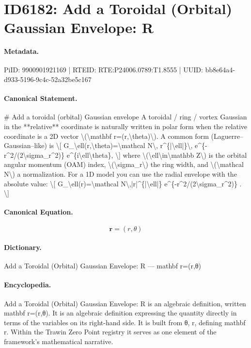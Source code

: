 \section*{ID6182: Add a Toroidal (Orbital) Gaussian Envelope: R}
\paragraph{Metadata.}
PiID: 9900901921169 | RTEID: RTE:P24006.0789:T1.8555 | UUID: bb8e64a4-d933-5196-9c4c-52a32be5c167

\paragraph{Canonical Statement.}
\# Add a toroidal (orbital) Gaussian envelope A toroidal / ring / vortex Gaussian in the **relative** coordinate is naturally written in polar form when the relative coordinate is a 2D vector \textbackslash{}(\textbackslash{}mathbf r=(r,\textbackslash{}theta)\textbackslash{}). A common form (Laguerre–Gaussian–like) is \textbackslash{}[ G\_\textbackslash{}ell(r,\textbackslash{}theta)=\textbackslash{}mathcal N\textbackslash{}, r\textasciicircum{}\{|\textbackslash{}ell|\}\textbackslash{}, e\textasciicircum{}\{-r\textasciicircum{}2/(2\textbackslash{}sigma\_r\textasciicircum{}2)\} e\textasciicircum{}\{i\textbackslash{}ell\textbackslash{}theta\}, \textbackslash{}] where \textbackslash{}(\textbackslash{}ell\textbackslash{}in\textbackslash{}mathbb Z\textbackslash{}) is the orbital angular momentum (OAM) index, \textbackslash{}(\textbackslash{}sigma\_r\textbackslash{}) the ring width, and \textbackslash{}(\textbackslash{}mathcal N\textbackslash{}) a normalization. For a 1D model you can use the radial envelope with the absolute value: \textbackslash{}[ G\_\textbackslash{}ell(r)=\textbackslash{}mathcal N\textbackslash{},|r|\textasciicircum{}\{|\textbackslash{}ell|\} e\textasciicircum{}\{-r\textasciicircum{}2/(2\textbackslash{}sigma\_r\textasciicircum{}2)\} . \textbackslash{}]

\paragraph{Canonical Equation.}
\[
\mathbf r=(r,\theta)
\]

\paragraph{Dictionary.}
Add a Toroidal (Orbital) Gaussian Envelope: R — mathbf r=(r,θ)

\paragraph{Encyclopedia.}
Add a Toroidal (Orbital) Gaussian Envelope: R is an algebraic definition, written mathbf r=(r,θ). It is an algebraic definition expressing the quantity directly in terms of the variables on its right-hand side. It is built from θ, r, defining mathbf r. Within the Trawin Zero Point registry it serves as one element of the framework's mathematical narrative.
